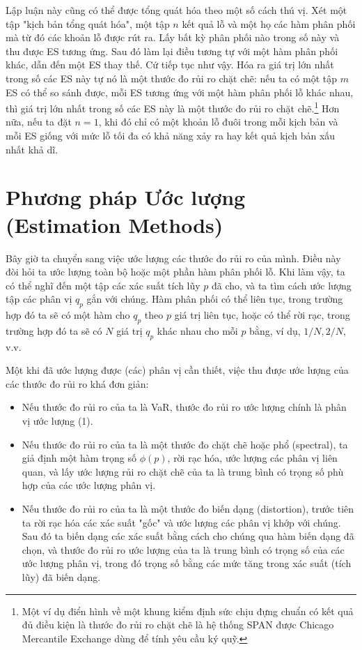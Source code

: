 Lập luận này cũng có thể được tổng quát hóa theo một số cách thú vị. Xét một tập "kịch bản tổng quát hóa", một tập $n$ kết quả lỗ và một họ các hàm phân phối mà từ đó các khoản lỗ được rút ra. Lấy bất kỳ phân phối nào trong số này và thu được ES tương ứng. Sau đó làm lại điều tương tự với một hàm phân phối khác, dẫn đến một ES thay thế. Cứ tiếp tục như vậy. Hóa ra giá trị lớn nhất trong số các ES này tự nó là một thước đo rủi ro chặt chẽ: nếu ta có một tập $m$ ES có thể so sánh được, mỗi ES tương ứng với một hàm phân phối lỗ khác nhau, thì giá trị lớn nhất trong số các ES này là một thước đo rủi ro chặt chẽ.\footnote{Một ví dụ điển hình về một khung kiểm định sức chịu đựng chuẩn có kết quả đủ điều kiện là thước đo rủi ro chặt chẽ là hệ thống SPAN được Chicago Mercantile Exchange dùng để tính yêu cầu ký quỹ.} Hơn nữa, nếu ta đặt $n=1$, khi đó chỉ có một khoản lỗ đuôi trong mỗi kịch bản và mỗi ES giống với mức lỗ tối đa có khả năng xảy ra hay kết quả kịch bản xấu nhất khả dĩ.

\section{Phương pháp Ước lượng (Estimation Methods)}

Bây giờ ta chuyển sang việc ước lượng các thước đo rủi ro của mình. Điều này đòi hỏi ta ước lượng toàn bộ hoặc một phần hàm phân phối lỗ. Khi làm vậy, ta có thể nghĩ đến một tập các xác suất tích lũy $p$ đã cho, và ta tìm cách ước lượng tập các phân vị $q_p$ gắn với chúng. Hàm phân phối có thể liên tục, trong trường hợp đó ta sẽ có một hàm cho $q_p$ theo $p$ giá trị liên tục, hoặc có thể rời rạc, trong trường hợp đó ta sẽ có $N$ giá trị $q_p$ khác nhau cho mỗi $p$ bằng, ví dụ, $1/N, 2/N$, v.v.

Một khi đã ước lượng được (các) phân vị cần thiết, việc thu được ước lượng của các thước đo rủi ro khá đơn giản:

\begin{itemize}
  \item Nếu thước đo rủi ro của ta là VaR, thước đo rủi ro ước lượng chính là phân vị ước lượng (1).
  \item Nếu thước đo rủi ro của ta là một thước đo chặt chẽ hoặc phổ (spectral), ta giả định một hàm trọng số $\phi(p)$, rời rạc hóa, ước lượng các phân vị liên quan, và lấy ước lượng rủi ro chặt chẽ của ta là trung bình có trọng số phù hợp của các ước lượng phân vị.
  \item Nếu thước đo rủi ro của ta là một thước đo biến dạng (distortion), trước tiên ta rời rạc hóa các xác suất "gốc" và ước lượng các phân vị khớp với chúng. Sau đó ta biến dạng các xác suất bằng cách cho chúng qua hàm biến dạng đã chọn, và thước đo rủi ro ước lượng của ta là trung bình có trọng số của các ước lượng phân vị, trong đó trọng số bằng các mức tăng trong xác suất (tích lũy) đã biến dạng.
\end{itemize}

